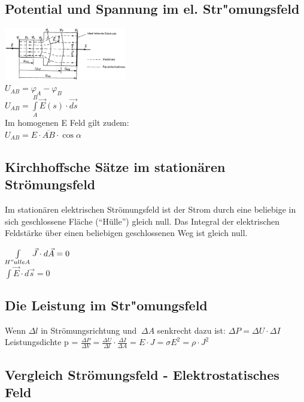 \subsection{Potential und Spannung im el. Str"omungsfeld}
\begin{multicols}{2}
\includegraphics[width=0.4\textwidth]{pics/stroemungsfeld/feldlinien}\\
$ U_{AB} = \varphi_A - \varphi_B $\\
$ U_{AB} = \int\limits_{A}^B \vec E (s) \cdot  \vec{ds} $ \\
Im homogenen E Feld gilt zudem: \\
$ U_{AB} = E \cdot \overline{AB} \cdot \cos\alpha $ \\
\end{multicols}

\subsection{Kirchhoffsche Sätze im stationären Strömungsfeld}
\begin{minipage}{13.5cm}
Im stationären elektrischen Strömungsfeld ist der Strom durch eine beliebige in sich geschlossene Fläche ("`Hülle"') gleich null.
Das Integral der elektrischen Feldstärke über einen beliebigen geschlossenen Weg ist gleich null. 
\end{minipage}
\begin{minipage}{4cm}
	\centering
		$ \int\limits_{H"ulle A} \vec J \cdot d \vec A = 0 $ \\
		$ \int \vec E \cdot d \vec s = 0 $ 
\end{minipage}

\subsection{Die Leistung im Str"omungsfeld}
Wenn $ \Delta{l}$ in Strömungsrichtung und $\ \Delta{A}$ senkrecht dazu ist: $ \Delta P = \Delta U \cdot \Delta I $\\
 Leistungsdichte p = $\frac{\Delta P}{\Delta V} = \frac{\Delta U }{\Delta l} \cdot \frac{\Delta I}{\Delta A} = E \cdot J = \sigma E^2 = \rho \cdot J^2 $\\

\subsection{Vergleich Strömungsfeld - Elektrostatisches Feld}

